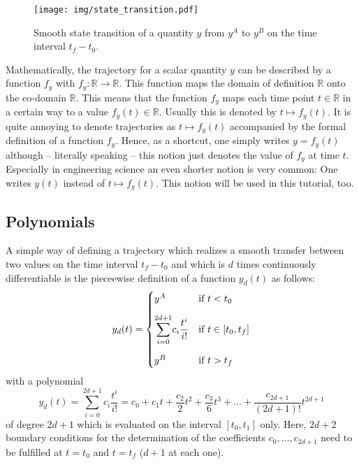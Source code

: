 \documentclass[a4paper,12pt,headinclude=true,headsepline,parskip=half,DIV=12]{scrartcl}
\begin{document}
\begin{figure}[ht]
  \centering
  \texttt{[image: img/state\_transition.pdf]}
  \caption{Smooth state transition of a quantity $y$ from $y^A$ to $y^B$ on the time interval $t_f - t_0$.}
  \label{fig:smoothtraj}
\end{figure}

Mathematically, the trajectory for a scalar quantity $y$ can be described by a function $f_y$ with $f_y : \mathbb{R} \to \mathbb{R}$. This function maps the domain of definition $\mathbb{R}$ onto the co-domain $\mathbb{R}$. This means that the function $f_y$ maps each time point $t \in \mathbb{R}$ in a certain way to a value $f_y(t) \in \mathbb{R}$. Usually this is denoted by $t \mapsto f_y(t)$. It is quite annoying to denote trajectories as $t \mapsto f_y(t)$ accompanied by the formal definition of a function $f_y$. Hence, as a shortcut, one simply writes $y = f_y(t)$ although -- literally speaking -- this notion just denotes the value of $f_y$ at time $t$. Especially in engineering science an even shorter notion is very common: One writes $y(t)$ instead of $t \mapsto f_y(t)$. This notion will be used in this tutorial, too.


\subsection{Polynomials} \label{sec:polynomials}
A simple way of defining a trajectory which realizes a smooth transfer between two values on the time interval $t_f - t_0$ and which is $d$ times continuously differentiable is the pieceewise definition of a function $y_d(t)$ as follows:
\begin{equation}
  y_d(t)=
  \begin{cases}
    y^A                                              & \textrm{if } t<t_0          \\[2ex]
    \mathlarger{\sum_{i=0}^{2d+1}}c_i\dfrac{t^i}{i!} & \textrm{if } t\in [t_0,t_f] \\[4ex]
    y^B                                              & \textrm{if } t>t_f
  \end{cases} \label{eq:TrajPoly}
\end{equation}
with a polynomial
\begin{equation}
  y_d(t)=\sum_{i=0}^{2d+1}c_i\frac{t^i}{i!} = c_0 + c_1 t + \frac{c_2}{2}t^2 + \frac{c_3}{6} t^3 + \ldots + \frac{c_{2d+1}}{(2d+1)!} t^{2d+1}
\end{equation}
of degree $2d+1$ which is evaluated on the interval $[t_0, t_1]$ only. Here, $2d+2$ boundary conditions for the determination of the coefficients $c_0, \ldots, c_{2d+1}$ need to be fulfilled at $t = t_0$ and $t = t_f$ ($d+1$ at each one).
\end{document}

